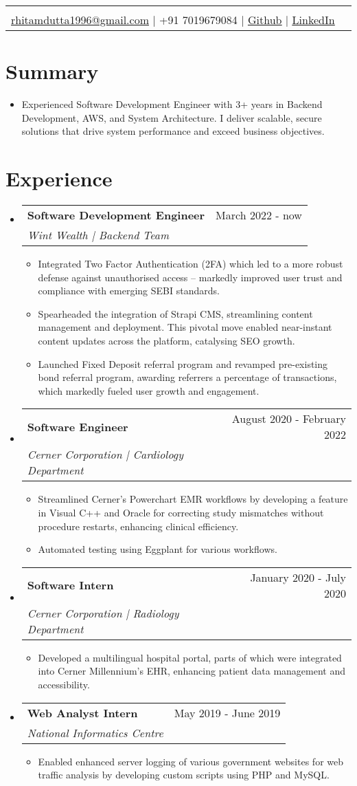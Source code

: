 \documentclass[letterpaper,11pt]{article}
\makeatletter
\newcommand{\sectionStart}{
  \begin{itemize}[label={},leftmargin=0in]
}
\newcommand{\sectionEnd}{
  \end{itemize}
}
\newcommand{\head}[6]{
  \noindent
  \begin{tabular*}{\textwidth}{l@{\extracolsep{\fill}}r}
    \centerline{
      \textbf{\href{#1}{\color{blue}{\LARGE {\underline{#2}}}}}
    }
    \vspace{5pt}\\
    \centerline{
      \href{mailto:#3}{\underline{#3}} $\mid$
      #4 $\mid$
       \href{#5}{\underline{Github}} $\mid$
       \href{#6}{\underline{LinkedIn}}
    }
  \end{tabular*}
  \vspace{-10pt}
}
\newcommand{\summaryText}[1]{
  \item
  \begin{addmargin}[7pt]{0pt}
    \small{#1}
  \end{addmargin}
}
\newcommand{\jobHeading}[3]{
  \vspace{-1pt}
  \item
  \begin{tabular*}{1.0\textwidth}{l@{\extracolsep{\fill}}r@{}}
    \normalsize{\textbf{#1}} & #2 \\
    \textit{\small#3} \\
  \end{tabular*}\vspace{-5pt}
}
\newcommand{\listStart}{\begin{itemize}}
\newcommand{\listEnd}{\end{itemize}\vspace{-6pt}}
\newcommand{\bulletItem}[1]{
  \item
  \small{
    {#1 \vspace{-1.8pt}}
  }
}
\makeatother
\begin{document}
\head
  {https://rhit.am/portfolio/} %
  {Rhitam Dutta} %
  {rhitamdutta1996@gmail.com} %
  {+91 7019679084} %
  {https://github.com/exthazor} %
  {https://www.linkedin.com/in/rhitam-dutta} %

\section{Summary}
\sectionStart
  \summaryText
  {Experienced Software Development Engineer with 3+ years in Backend Development, AWS, and System Architecture. I deliver scalable, secure solutions that drive system performance and exceed business objectives.}
\sectionEnd

\section{Experience}
\sectionStart
 \jobHeading
    {Software Development Engineer}
    {March 2022 - now}
    {Wint Wealth | Backend Team}
  \listStart
    \bulletItem
    {Integrated Two Factor Authentication (2FA) which led to a more robust defense against unauthorised access -- markedly improved user trust and compliance with emerging SEBI standards.}
    \bulletItem
    {Spearheaded the integration of Strapi CMS, streamlining content management and deployment. This pivotal move enabled near-instant content updates across the platform, catalysing SEO growth.}
   \bulletItem
    {Launched Fixed Deposit referral program and revamped pre-existing bond referral program, awarding referrers a percentage of transactions, which markedly fueled user growth and engagement.}
   \listEnd
  \jobHeading
    {Software Engineer}
    {August 2020 - February 2022}
    {Cerner Corporation | Cardiology Department}
  \listStart
    \bulletItem
    {Streamlined Cerner's Powerchart EMR workflows by developing a feature in Visual C++ and Oracle for correcting study mismatches without procedure restarts, enhancing clinical efficiency. }
   \bulletItem
   {Automated testing using Eggplant for various workflows.}
   \listEnd
  \jobHeading
    {Software Intern} 
    {January 2020 - July 2020}
    {Cerner Corporation | Radiology Department}
  \listStart
    \bulletItem
    {Developed a multilingual hospital portal, parts of which were integrated into Cerner Millennium's EHR, enhancing patient data management and accessibility.}
  \listEnd
  \jobHeading
    {Web Analyst Intern} 
    {May 2019 - June 2019}
    {National Informatics Centre}
  \listStart
    \bulletItem
    {Enabled enhanced server logging of various government websites for web traffic analysis by developing custom scripts using PHP and MySQL.}
  \listEnd
\sectionEnd
\end{document}

